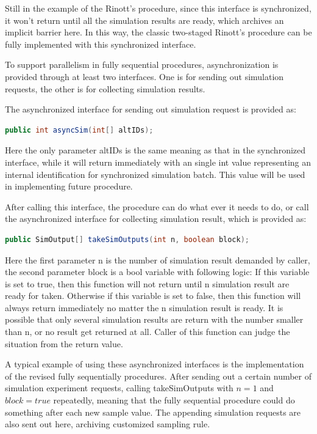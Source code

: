 \documentclass[12pt,a4]{report}
\begin{document}
Still in the example of the Rinott's procedure, since this interface is synchronized, it won't return until all the simulation results are ready, which archives an implicit barrier here. In this way, the classic two-staged Rinott's procedure can be fully implemented with this synchronized interface.

To support parallelism in fully sequential procedures, asynchronization is provided through at least two interfaces. One is for sending out simulation requests, the other is for collecting simulation results.

The asynchronized interface for sending out simulation request is provided as:

\begin{lstlisting}[language=Java]
public int asyncSim(int[] altIDs);
\end{lstlisting}

Here the only parameter altIDs is the same meaning as that in the synchronized interface, while it will return immediately with an single int value representing an internal identification for synchronized simulation batch. This value will be used in implementing future procedure.

After calling this interface, the procedure can do what ever it needs to do, or call the asynchronized interface for collecting simulation result, which is provided as:

\begin{lstlisting}[language=Java]
public SimOutput[] takeSimOutputs(int n, boolean block);
\end{lstlisting}

Here the first parameter n is the number of simulation result demanded by caller, the second parameter block is a bool variable with following logic: If this variable is set to true, then this function will not return until n simulation result are ready for taken. Otherwise if this variable  is set to false, then this function will always return immediately no matter the n simulation result is ready. It is possible that only several simulation results are return with the number smaller than n, or no result get returned at all. Caller of this function can judge the situation from the return value.

A typical example of using these asynchronized interfaces is the implementation of the revised fully sequentially procedures. After sending out a certain number of simulation experiment requests, calling takeSimOutputs with $n = 1$ and $block = true$ repeatedly, meaning that the fully sequential procedure could do something after each new sample value. The appending simulation requests are also sent out here, archiving customized sampling rule.
\end{document}

